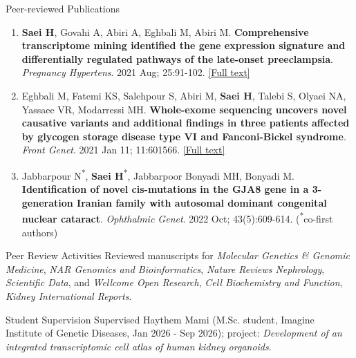 \documentclass[
	11pt, %
]{resume} %
\begin{document}
\begin{rSection}{Peer-reviewed Publications}
\begin{enumerate}
  \item \textbf{Saei H}, Govahi A, Abiri A, Eghbali M, Abiri M.  \textbf{Comprehensive transcriptome mining identified the gene
  expression signature and differentially regulated pathways of the late-onset preeclampsia}. 
  \textit{Pregnancy Hypertens}. 2021 Aug; 25:91-102. \href{https://www.sciencedirect.com/science/article/abs/pii/S2210778921000386?via%3Dihub}{[Full text]}

  \item Eghbali M, Fatemi KS, Salehpour S, Abiri M, \textbf{Saei H}, Talebi S, Olyaei NA, Yassaee VR, Modarressi MH. 
   \textbf{Whole-exome sequencing uncovers novel causative variants and additional findings in three patients affected by
  glycogen storage disease type VI and Fanconi-Bickel syndrome}. 
  \textit{Front Genet}. 2021 Jan 11; 11:601566. \href{https://www.frontiersin.org/journals/genetics/articles/10.3389/fgene.2020.601566/full}{[Full text]}

  \item Jabbarpour N\textsuperscript{*}, \textbf{Saei H}\textsuperscript{*}, Jabbarpoor Bonyadi MH, Bonyadi M. 
   \textbf{Identification of novel cis-mutations in the GJA8 gene in a 3-generation Iranian family with autosomal dominant congenital nuclear cataract}. 
  \textit{Ophthalmic Genet}. 2022 Oct; 43(5):609-614. (\textsuperscript{*}co-first authors)
\end{enumerate}

\end{rSection}


\begin{rSection}{Peer Review Activities}
Reviewed manuscripts for  \textit{Molecular Genetics \& Genomic Medicine}, \textit{NAR Genomics and Bioinformatics}, \textit{Nature Reviews Nephrology}, \textit{Scientific Data}, and \textit{Wellcome Open Research}, \textit{Cell Biochemistry and Function}, \textit{Kidney International Reports}.
\end{rSection}

\begin{rSection}{Student Supervision}
Supervised Haythem Mami (M.Sc. student, Imagine Institute of Genetic Diseases, Jan 2026 - Sep 2026); project: \textit{Development of an integrated transcriptomic cell atlas of human kidney organoids}.
\end{rSection}
\end{document}
